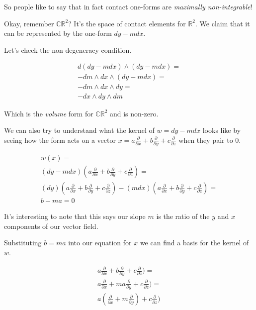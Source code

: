 \documentclass{article}
\theoremstyle{definition}
\begin{document}
So people like to say that in fact contact one-forms are \textit{maximally non-integrable}!

Okay, remember $\mathbb{CR}^{2}$? It's the space of contact elements for
$\mathbb{R}^2$. We claim that it can be represented by the one-form $dy - mdx$.

Let's check the non-degeneracy condition.

\begin{align*}
  d (dy - mdx) \wedge (dy - mdx) = \\
  -dm \wedge dx \wedge (dy - mdx) = \\
  -dm \wedge dx \wedge dy = \\
  -dx \wedge dy \wedge dm
\end{align*}

Which is the \textit{volume} form for $\mathbb{CR}^{2}$ and is non-zero.

We can also try to understand what the kernel of $w = dy - mdx$ looks like by seeing
how the form acts on a vector $x = a\frac{\partial}{\partial x} +
b\frac{\partial}{\partial y} + c\frac{\partial}{\partial z}$ when they pair to 0.

\begin{align*}
  w (x) = \\
  (dy - mdx) (a\frac{\partial}{\partial x} +
  b\frac{\partial}{\partial y} + c\frac{\partial}{\partial z}) = \\
  (dy)(a\frac{\partial}{\partial x} +
b\frac{\partial}{\partial y} + c\frac{\partial}{\partial z}) - (mdx)(a\frac{\partial}{\partial x} +
b\frac{\partial}{\partial y} + c\frac{\partial}{\partial z}) = \\
  b - ma = 0
\end{align*}

It's interesting to note that this says our slope $m$ is the ratio of the $y$
and $x$ components of our vector field.

Substituting $b = ma$ into our equation for $x$ we can find a basis for the
kernel of $w$.

\begin{align*}
  a\frac{\partial}{\partial x} +
    b\frac{\partial}{\partial y} + c\frac{\partial}{\partial z}) = \\
  a\frac{\partial}{\partial x} +
    ma\frac{\partial}{\partial y} + c\frac{\partial}{\partial z}) = \\
  a(\frac{\partial}{\partial x} +
    m\frac{\partial}{\partial y}) + c\frac{\partial}{\partial z}) 
\end{align*}
\end{document}
